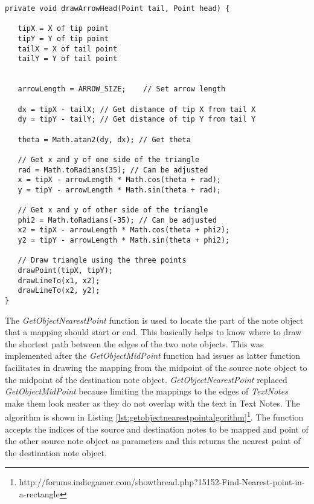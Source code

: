 \begin{lstlisting}[frame=single, label=lst:drawarrowheadalgorithm, caption=\textit{DrawArrowHead} algorithm as posted by Komplot in stackoverflow.com]
private void drawArrowHead(Point tail, Point head) {

   tipX = X of tip point
   tipY = Y of tip point
   tailX = X of tail point
   tailY = Y of tail point
    	

   arrowLength = ARROW_SIZE;    // Set arrow length

   dx = tipX - tailX; // Get distance of tip X from tail X   
   dy = tipY - tailY; // Get distance of tip Y from tail Y

   theta = Math.atan2(dy, dx); // Get theta

   // Get x and y of one side of the triangle
   rad = Math.toRadians(35); // Can be adjusted
   x = tipX - arrowLength * Math.cos(theta + rad);
   y = tipY - arrowLength * Math.sin(theta + rad);

   // Get x and y of other side of the triangle
   phi2 = Math.toRadians(-35); // Can be adjusted
   x2 = tipX - arrowLength * Math.cos(theta + phi2);
   y2 = tipY - arrowLength * Math.sin(theta + phi2);

   // Draw triangle using the three points
   drawPoint(tipX, tipY);
   drawLineTo(x1, x2);
   drawLineTo(x2, y2);
}
\end{lstlisting}

The \textit{GetObjectNearestPoint} function is used to locate the part of the note object that a mapping should start or end. This basically helps to know where to draw the shortest path between the edges of the two note objects. This was implemented after the \textit{GetObjectMidPoint} function had issues as latter function facilitates in drawing the mapping from the midpoint of the source note object to the midpoint of the destination note object. \textit{GetObjectNearestPoint} replaced \textit{GetObjectMidPoint} because limiting the mappings to the edges of \textit{TextNotes} make them look neater as they do not overlap with the text in Text Notes. The algorithm is shown in Listing \ref{lst:getobjectnearestpointalgorithm}\footnote[8]{http://forums.indiegamer.com/showthread.php?15152-Find-Nearest-point-in-a-rectangle}. The function accepts the indices of the source and destination notes to be mapped and point of the other source note object as parameters and this returns the nearest point of the destination note object.

